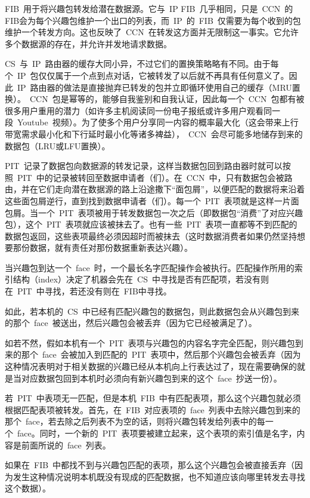 FIB~用于将兴趣包转发给潜在数据源。它与~IP FIB~几乎相同，只是~CCN~的FIB会为每个兴趣包维护一个出口的列表，而~IP~的~FIB~仅需要为每个收到的包维护一个转发方向。这也反映了~CCN~在转发这方面并无限制这一事实。它允许多个数据源的存在，并允许并发地请求数据。

CS~与~IP~路由器的缓存大同小异，不过它们的置换策略略有不同。由于每个~IP~包仅仅属于一个点到点对话，它被转发了以后就不再具有任何意义了。因此~IP~路由器的做法是直接抛弃已转发的包并立即循环使用自己的缓存（MRU置换）。~CCN~包是幂等的，能够自我鉴别和自我认证，因此每一个~CCN~包都有被很多用户重用的潜力（如许多主机阅读同一份电子报纸或许多用户观看同一段~Youtube~视频）。为了使多个用户分享同一内容的概率最大化（这会带来上行带宽需求最小化和下行延时最小化等诸多裨益），~CCN~会尽可能多地储存到来的数据包（LRU或LFU置换）。

PIT~记录了数据包向数据源的转发记录，这样当数据包回到路由器时就可以按照~PIT~中的记录被转回至数据申请者（们）。在~CCN~中，只有数据包会被路由，并在它们走向潜在数据源的路上沿途撒下“面包屑”，以便匹配的数据将来沿着这些面包屑逆行，直到找到数据申请者（们）。每一个~PIT~表项就是这样一片面包屑。当一个~PIT~表项被用于转发数据包一次之后（即数据包“消费”了对应兴趣包），这个~PIT~表项就应该被抹去了。也有一些~PIT~表项一直都等不到匹配的数据包返回，这些表项最终必须因超时而被抹去（这时数据消费者如果仍然坚持想要那份数据，就有责任对那份数据重新表达兴趣）。

当兴趣包到达一个~face~时，一个最长名字匹配操作会被执行。匹配操作所用的索引结构（index）决定了机器会先在~CS~中寻找是否有匹配项，若没有则在~PIT~中寻找，若还没有则在~FIB中寻找。

如此，若本机的~CS~中已经有匹配兴趣包的数据包，则此数据包会从兴趣包到来的那个~face~被送出，然后兴趣包会被丢弃（因为它已经被满足了）。

如若不然，假如本机有一个~PIT~表项与兴趣包的内容名字完全匹配，则兴趣包到来的那个~face~会被加入到匹配的~PIT~表项中，然后那个兴趣包会被丢弃（因为这种情况表明对于相关数据的兴趣已经从本机向上行表达过了，现在需要确保的就是当对应数据包回到本机时必须向有新兴趣包到来的这个~face~抄送一份）。

若~PIT~中表项无一匹配，但是本机~FIB~中有匹配表项，那么这个兴趣包就必须根据匹配表项被转发。首先，在~FIB~对应表项的~face~列表中去除兴趣包到来的那个~face，若去除之后列表不为空的话，则将兴趣包转发给列表中的每一个~face。同时，一个新的~PIT~表项要被建立起来，这个表项的索引值是名字，内容是前面所说的~face~列表。

如果在~FIB~中都找不到与兴趣包匹配的表项，那么这个兴趣包会被直接丢弃（因为发生这种情况说明本机既没有现成的匹配数据，也不知道应该向哪里转发去寻找这个数据）。

